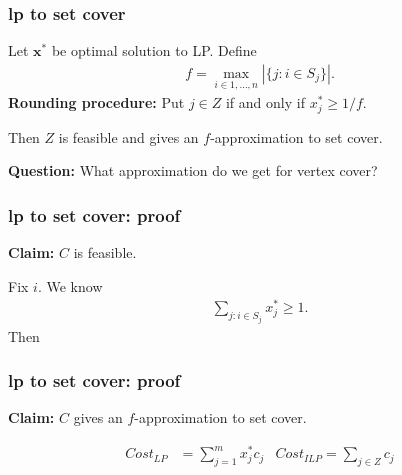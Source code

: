 \documentclass[compress]{beamer}
\begin{document}
\begin{frame}
	\frametitle{lp to set cover}
	
	\begin{theorem}
		Let $\mathbf{x^*}$ be optimal solution to LP.
		Define 
		\begin{align*}
			f = \max_{i \in 1,\ldots,n} |\{j: i \in S_j\}|.
		\end{align*}
		\textbf{Rounding procedure:} Put $j \in Z$ if and only if $x^*_j \geq 1/f$.
		
		Then $Z$ is feasible and gives an 
		$f$-approximation to set cover.
	\end{theorem}
	
	\textbf{Question:} What approximation do 
	we get for vertex cover?
\end{frame}

\begin{frame}
	\frametitle{lp to set cover: proof}
	\textbf{Claim:} $C$ is feasible.
	
	Fix $i$. We know
	\begin{align*}
		\sum_{j: i \in S_j} x^*_j \geq 1.
	\end{align*}
	Then
	
	\vspace{10em}
\end{frame}

\begin{frame}
	\frametitle{lp to set cover: proof}
	\textbf{Claim:} $C$ gives an $f$-approximation to set cover.
	
	\begin{align*}
		Cost_{LP} &= \sum_{j=1}^m x_j^* c_j & Cost_{ILP} = \sum_{j\in Z} c_j
	\end{align*}
	
	\vspace{10em}
\end{frame}
\end{document}

